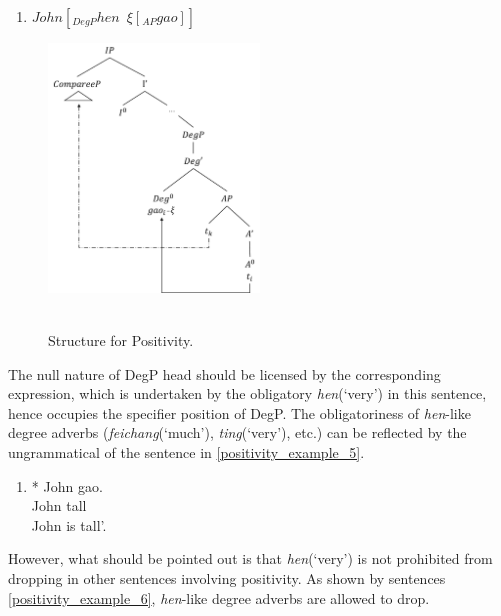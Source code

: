 \documentclass{ctexart}
\begin{document}
\begin{enumerate}
    \item $John [_{DegP} hen \enspace \xi [_{AP} gao]]$
\end{enumerate}

\begin{figure}[H]
    \centering
    \includegraphics[width=0.5\textwidth]{pic/positive_structure.png}
    \begin{caption}
        \\ \vspace{-1.1ex}
        Structure for Positivity.
    \end{caption}
\end{figure}

The null nature of DegP head should be licensed by the corresponding expression, which is undertaken by the obligatory \textit{hen}(`very') in this sentence, hence occupies the specifier position of DegP. The obligatoriness of \textit{hen}-like degree adverbs (\textit{feichang}(`much'), \textit{ting}(`very'), etc.) can be reflected by the ungrammatical of the sentence in \ref{positivity_example_5}.

\begin{enumerate}
    \item \label{positivity_example_5}
    * John gao.  \\
    \hspace*{0.5em} John tall \\
    \hspace*{0.5em} John is tall'.
\end{enumerate}

However, what should be pointed out is that \textit{hen}(`very') is not prohibited from dropping in other sentences involving positivity. As shown by sentences \ref{positivity_example_6}, \textit{hen}-like degree adverbs are allowed to drop.
\end{document}
